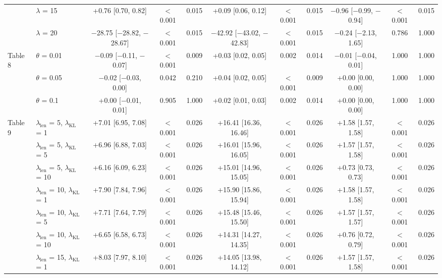 \begin{table}[!htb]
{\begin{tabular}{llccccccccc}
 & $\lambda$ = 15 & +0.76 [0.70, 0.82] & $<$0.001 & 0.015 & +0.09 [0.06, 0.12] & $<$0.001 & 0.015 & $-$0.96 [$-$0.99, $-$0.94] & $<$0.001 & 0.015 \\
 & $\lambda$ = 20 & $-$28.75 [$-$28.82, $-$28.67] & $<$0.001 & 0.015 & $-$42.92 [$-$43.02, $-$42.83] & $<$0.001 & 0.015 & $-$0.24 [$-$2.13, 1.65] & 0.786 & 1.000 \\
\midrule
\multirow{3}{*}{Table 8} & $\theta$ = 0.01 & $-$0.09 [$-$0.11, $-$0.07] & $<$0.001 & 0.009 & +0.03 [0.02, 0.05] & 0.002 & 0.014 & $-$0.01 [$-$0.04, 0.01] & 1.000 & 1.000 \\
 & $\theta$ = 0.05 & $-$0.02 [$-$0.03, 0.00] & 0.042 & 0.210 & +0.04 [0.02, 0.05] & $<$0.001 & 0.009 & +0.00 [0.00, 0.00] & 1.000 & 1.000 \\
 & $\theta$ = 0.1 & +0.00 [$-$0.01, 0.01] & 0.905 & 1.000 & +0.02 [0.01, 0.03] & 0.002 & 0.014 & +0.00 [0.00, 0.00] & 1.000 & 1.000 \\
\midrule
\multirow{9}{*}{Table 9} & $\lambda_{\mathrm{len}}$ = 5, $\lambda_{\mathrm{KL}}$ = 1 & +7.01 [6.95, 7.08] & $<$0.001 & 0.026 & +16.41 [16.36, 16.46] & $<$0.001 & 0.026 & +1.58 [1.57, 1.58] & $<$0.001 & 0.026 \\
 & $\lambda_{\mathrm{len}}$ = 5, $\lambda_{\mathrm{KL}}$ = 5 & +6.96 [6.88, 7.03] & $<$0.001 & 0.026 & +16.01 [15.96, 16.05] & $<$0.001 & 0.026 & +1.57 [1.57, 1.58] & $<$0.001 & 0.026 \\
 & $\lambda_{\mathrm{len}}$ = 5, $\lambda_{\mathrm{KL}}$ = 10 & +6.16 [6.09, 6.23] & $<$0.001 & 0.026 & +15.01 [14.96, 15.05] & $<$0.001 & 0.026 & +0.73 [0.73, 0.73] & $<$0.001 & 0.026 \\
 & $\lambda_{\mathrm{len}}$ = 10, $\lambda_{\mathrm{KL}}$ = 1 & +7.90 [7.84, 7.96] & $<$0.001 & 0.026 & +15.90 [15.86, 15.94] & $<$0.001 & 0.026 & +1.58 [1.57, 1.58] & $<$0.001 & 0.026 \\
 & $\lambda_{\mathrm{len}}$ = 10, $\lambda_{\mathrm{KL}}$ = 5 & +7.71 [7.64, 7.79] & $<$0.001 & 0.026 & +15.48 [15.46, 15.50] & $<$0.001 & 0.026 & +1.57 [1.57, 1.57] & $<$0.001 & 0.026 \\
 & $\lambda_{\mathrm{len}}$ = 10, $\lambda_{\mathrm{KL}}$ = 10 & +6.65 [6.58, 6.73] & $<$0.001 & 0.026 & +14.31 [14.27, 14.35] & $<$0.001 & 0.026 & +0.76 [0.72, 0.79] & $<$0.001 & 0.026 \\
 & $\lambda_{\mathrm{len}}$ = 15, $\lambda_{\mathrm{KL}}$ = 1 & +8.03 [7.97, 8.10] & $<$0.001 & 0.026 & +14.05 [13.98, 14.12] & $<$0.001 & 0.026 & +1.57 [1.57, 1.58] & $<$0.001 & 0.026 \\

\end{tabular}}
\end{table}

